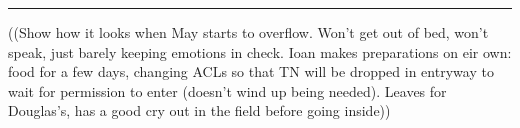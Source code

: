 \begin{center}\rule{0.5\linewidth}{0.5pt}\end{center}

((Show how it looks when May starts to overflow. Won't get out of bed, won't speak, just barely keeping emotions in check. Ioan makes preparations on eir own: food for a few days, changing ACLs so that TN will be dropped in entryway to wait for permission to enter (doesn't wind up being needed). Leaves for Douglas's, has a good cry out in the field before going inside))
